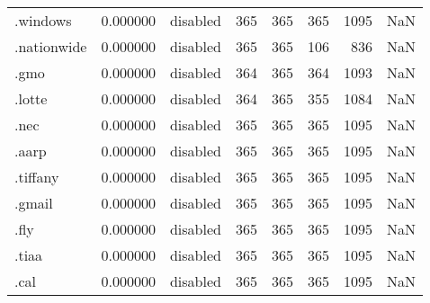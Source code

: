 \begin{tabular}{lrlrrrrl}
.windows                  &          0.000000 &        disabled &                         365 &                         365 &                         365 &                1095 &                  NaN \\
.nationwide               &          0.000000 &        disabled &                         365 &                         365 &                         106 &                 836 &                  NaN \\
.gmo                      &          0.000000 &        disabled &                         364 &                         365 &                         364 &                1093 &                  NaN \\
.lotte                    &          0.000000 &        disabled &                         364 &                         365 &                         355 &                1084 &                  NaN \\
.nec                      &          0.000000 &        disabled &                         365 &                         365 &                         365 &                1095 &                  NaN \\
.aarp                     &          0.000000 &        disabled &                         365 &                         365 &                         365 &                1095 &                  NaN \\
.tiffany                  &          0.000000 &        disabled &                         365 &                         365 &                         365 &                1095 &                  NaN \\
.gmail                    &          0.000000 &        disabled &                         365 &                         365 &                         365 &                1095 &                  NaN \\
.fly                      &          0.000000 &        disabled &                         365 &                         365 &                         365 &                1095 &                  NaN \\
.tiaa                     &          0.000000 &        disabled &                         365 &                         365 &                         365 &                1095 &                  NaN \\
.cal                      &          0.000000 &        disabled &                         365 &                         365 &                         365 &                1095 &                  NaN \\

\end{tabular}
